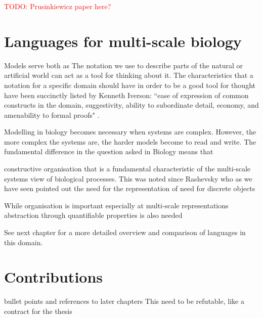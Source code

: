 \documentclass[phd]{infthesis}
\newcommand{\todo}[1]{\textcolor{red}{TODO: #1}}
\begin{document}
\todo{Prusinkiewicz paper here?}



\section{Languages for multi-scale biology}
Models serve both as
The notation we use to describe parts of the natural or artificial world can act
as a tool for thinking about it. The characteristics that a notation for a
specific domain should have in order to be a good tool for thought have been
succinctly listed by Kenneth Iverson: ``ease of expression of common constructs
in the domain, suggestivity, ability to subordinate detail, economy, and
amenability to formal proofs" \cite{iverson2007notation}.

Modelling in biology becomes necessary when systems are complex. However, the
more complex the systems are, the harder models become to read and write.  The
fundamental difference in the question asked in Biology means that

constructive organisation that is a fundamental characteristic of the
multi-scale systems view of biological processes. This was noted since Rashevsky
who as we have seen pointed out the need for the representation of
need for discrete objects

While organisation is important especially at multi-scale representations
abstraction through quantifiable properties is also needed


See next chapter for a more detailed overview and comparison of languages in
this domain.



\section{Contributions}
bullet points and references to later chapters
This need to be refutable, like a contract for the thesis
\end{document}

